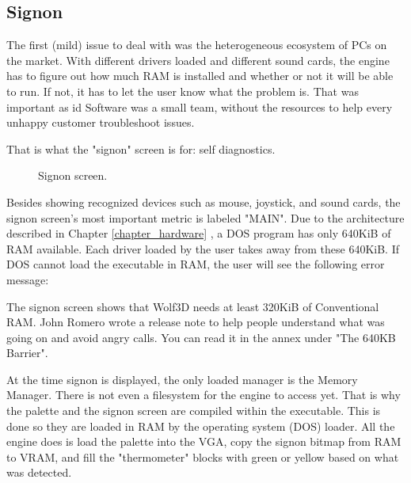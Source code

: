 \documentclass[book.tex]{subfiles}
\begin{document}
\subsection{Signon}
The first (mild) issue to deal with was the heterogeneous ecosystem of PCs on the market. With different drivers loaded and different sound cards, the engine has to figure out how much RAM is installed and whether or not it will be able to run. If not, it has to let the user know what the problem is. That was important as id Software was a small team, without the resources to help every unhappy customer troubleshoot issues.\\
\par
That is what the "signon" screen is for: self diagnostics. 
\par
\begin{figure}[H]
\centering
{}
\caption{Signon screen.}
\end{figure}
\par
Besides showing recognized devices such as mouse, joystick, and sound cards, the signon screen's most important metric is labeled "MAIN". Due to the architecture described in Chapter \ref{chapter_hardware} , a DOS program has only 640KiB of RAM available. Each driver loaded by the user takes away from these 640KiB. If DOS cannot load the executable in RAM, the user will see the following error message:\\
\par 
\begin{minipage}{\textwidth}

\end{minipage}
\par
The signon screen shows that Wolf3D needs at least 320KiB of Conventional RAM. John Romero wrote a release note to help people understand what was going on and avoid angry calls. You can read it in the annex under "The 640KB Barrier".\\
\par 
At the time signon is displayed, the only loaded manager is the Memory Manager. There is not even a filesystem for the engine to access yet. That is why the palette and the signon screen are compiled within the executable. This is done so they are loaded in RAM by the operating system (DOS) loader. All the engine does is load the palette into the VGA, copy the signon bitmap from RAM to VRAM, and fill the "thermometer" blocks with green or yellow based on what was detected.\\
\par
\end{document}
